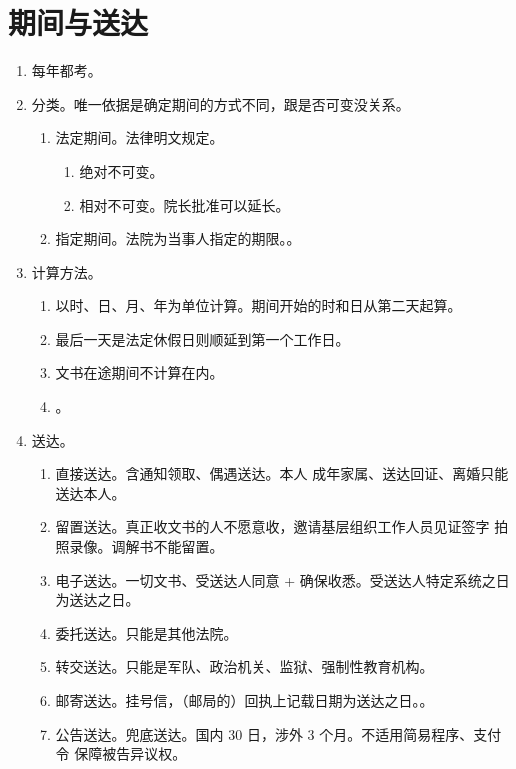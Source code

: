 \section{期间与送达}
\begin{enumerate}
  \item 每年都考。
  \item 分类。唯一依据是确定期间的方式不同，跟是否可变没关系。
        \begin{enumerate}
          \item 法定期间。法律明文规定。
                \begin{enumerate}
                  \item 绝对不可变。
                  \item 相对不可变。院长批准可以延长。
                \end{enumerate}
          \item 指定期间。法院为当事人指定的期限。。
        \end{enumerate}
  \item 计算方法。
        \begin{enumerate}
          \item 以时、日、月、年为单位计算。期间开始的时和日从第二天起算。
          \item 最后一天是法定休假日则顺延到第一个工作日。
          \item 文书在途期间不计算在内。
          \item {}。
        \end{enumerate}
  \item 送达。
        \begin{enumerate}
          \item 直接送达。含通知领取、偶遇送达。本人 \hz 成年家属、送达回证、离婚只能送达本人。
          \item 留置送达。真正收文书的人不愿意收，邀请基层组织工作人员见证签字 \hz 拍照录像。调解书不能留置。
          \item 电子送达。一切文书、受送达人同意 + 确保收悉。受送达人特定系统之日为送达之日。
          \item 委托送达。只能是其他法院。
          \item 转交送达。只能是军队、政治机关、监狱、强制性教育机构。
          \item 邮寄送达。挂号信，（邮局的）回执上记载日期为送达之日。。
          \item 公告送达。兜底送达。国内 30 日，涉外 3 个月。不适用简易程序、支付令 \yjt 保障被告异议权。
        \end{enumerate}
\end{enumerate}
